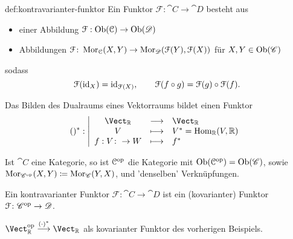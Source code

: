 \begin{definition}{def:kontravarianter-funktor}
   Ein  Funktor $\mathcal{F} : \cat{C} \to  \cat{D}$ besteht aus
   \begin{itemize}
       \item einer Abbildung $\mathcal{F}: \operatorname{Ob}(\mathcal{C}) \to  \operatorname{Ob}(\mathscr{D})$
       \item Abbildungen $\mathcal{F}\colon  \operatorname{Mor}_{\mathcal{C}}(X,Y) \to  \operatorname{Mor}_{\mathscr{D}}(\mathcal{F}(Y), \mathcal{F}(X))$ für $X,Y \in  \operatorname{Ob}(\mathscr{C})$
   \end{itemize}
   sodass
   \[
       \mathcal{F}(\mathrm{id}_X) = \mathrm{id}_{\mathcal{F}(X)}, \qquad \mathcal{F}(f \circ  g) = \mathcal{F} (g) \circ  \mathcal{F}(f)
   .\] 
\end{definition}

\begin{example}[Dualraum]
    Das Bilden des Dualraums eines Vektorraums bildet einen Funktor
        \begin{equation*}
            ()^* : \left| \begin{array}{c c l} 
        \Vect_{\R} & \longrightarrow & \Vect_{\R} \\
        V & \longmapsto &  V^*=\Hom_{\R}(V,\R) \\
        f: V\colon  \to  W & \longmapsto & f^*
        \end{array} \right.
    \end{equation*}
\end{example}

\begin{definition}[Dualkategorie]\label{def:dualkategorie}
    Ist $\cat{C}$ eine Kategorie, so ist $\mathcal{C}^{\textrm{op}}$ die Kategorie mit $\operatorname{Ob}(\mathcal{C}^{\textrm{op}}) = \operatorname{Ob}(\mathscr{C})$, sowie $\operatorname{Mor}_{\mathscr{C}^{\textrm{op}}}(X,Y) \coloneqq \operatorname{Mor}_{\mathscr{C}}(Y,X)$, und 'denselben' Verknüpfungen.
\end{definition}

\begin{lemma}\label{lm:kovariante-funktoren-sind-funktoren-von-der-dualen-kategorie}
    Ein kontravarianter Funktor $\mathcal{F}\colon \cat{C} \to  \cat{D}$ ist ein (kovarianter) Funktor $\mathcal{F}\colon  \mathscr{C}^{\textrm{op}} \to  \mathscr{D}$.
\end{lemma}

\begin{example}
$\Vect_{\R}^{\op} \stackrel{(\cdot )^*}{\longrightarrow} \Vect_{\R}$ als kovarianter Funktor des vorherigen Beispiels.
\end{example}

